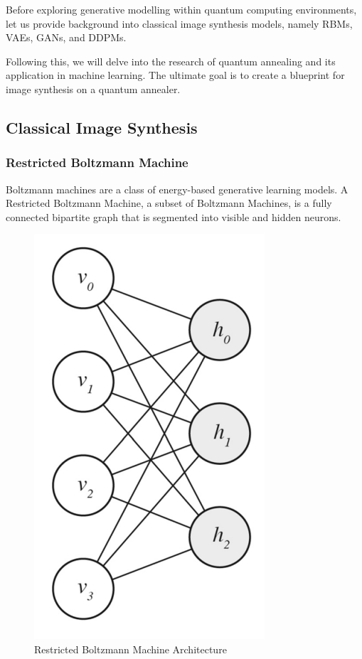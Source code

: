 \documentclass[%
 reprint,
 amsmath,amssymb,
 aps,
]{revtex4-2}
\begin{document}
Before exploring generative modelling within quantum computing environments, let us provide background into classical image synthesis models, namely RBMs, VAEs, GANs, and DDPMs.


Following this, we will delve into the research of quantum annealing and its application in machine learning. The ultimate goal is to create a blueprint for image synthesis on a quantum annealer.

\subsection{Classical Image Synthesis}
\subsubsection{Restricted Boltzmann Machine}
Boltzmann machines are a class of energy-based generative learning models. A Restricted Boltzmann Machine, a subset of Boltzmann Machines, is a fully connected bipartite graph that is segmented into visible and hidden neurons.

\begin{figure}[h]
    \includegraphics[width=0.6\columnwidth]{rbmgraph.png}
    \caption{\label{fig:backprop}Restricted Boltzmann Machine Architecture \cite{Jain2020}}
\end{figure}
\end{document}
